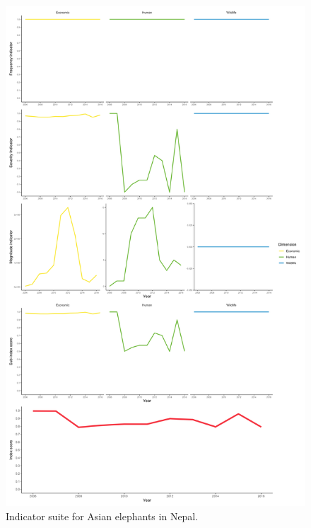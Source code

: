 \documentclass[fleqn,10pt]{olplainarticle}
\begin{document}
\begin{figure}
    \centering
    \includegraphics[width = 1\textwidth]{elephant_all.png}
    \caption{Indicator suite for Asian elephants in Nepal.}
    \label{fig:elephant}
\end{figure}
\end{document}
